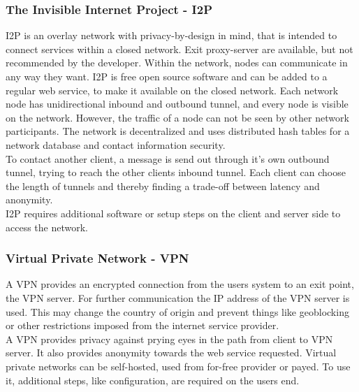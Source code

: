     
    
    \subsubsection{The Invisible Internet Project - I2P}
        I2P is an overlay network with privacy-by-design in mind, that is intended to connect services within a closed network.
        Exit proxy-server are available, but not recommended by the developer. Within the network, nodes can communicate in any way they want. I2P is free open source software and can be added to a regular web service, to make it available on the closed network. Each network node has unidirectional inbound and outbound tunnel, and every node is visible on the network. However, the traffic of a node can not be seen by other network participants. The network is decentralized and uses distributed hash tables for a network database and contact information security\cite{i2p_intro_2014}.\\
        To contact another client, a message is send out through it's own outbound tunnel, trying to reach the other clients inbound tunnel. Each client can choose the length of tunnels and thereby finding a trade-off between latency and anonymity\cite{anoncoin_i2p_2018}.\\
        I2P requires additional software or setup steps on the client and server side to access the network.\\
        
        
        
    
    \subsubsection{Virtual Private Network - VPN}
        A VPN provides an encrypted connection from the users system to an exit point, the VPN server. For further communication the IP address of the VPN server is used. This may change the country of origin and prevent things like geoblocking or other restrictions imposed from the internet service provider\cite{microsoft_virtual_2009}.\\
        A VPN provides privacy against prying eyes in the path from client to VPN server. It also provides anonymity towards the web service requested. Virtual private networks can be self-hosted, used from for-free provider or payed. To use it, additional steps, like configuration, are required on the users end.\\

